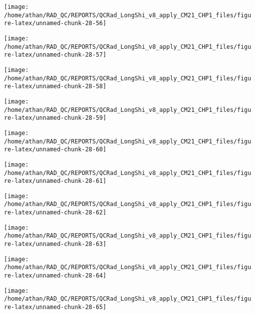 \documentclass[
  10pt,
  a4paper,oneside]{article}
\begin{document}
\begin{center}\texttt{[image: /home/athan/RAD\_QC/REPORTS/QCRad\_LongShi\_v8\_apply\_CM21\_CHP1\_files/figure-latex/unnamed-chunk-28-56]} \end{center}

\begin{center}\texttt{[image: /home/athan/RAD\_QC/REPORTS/QCRad\_LongShi\_v8\_apply\_CM21\_CHP1\_files/figure-latex/unnamed-chunk-28-57]} \end{center}

\begin{center}\texttt{[image: /home/athan/RAD\_QC/REPORTS/QCRad\_LongShi\_v8\_apply\_CM21\_CHP1\_files/figure-latex/unnamed-chunk-28-58]} \end{center}

\begin{center}\texttt{[image: /home/athan/RAD\_QC/REPORTS/QCRad\_LongShi\_v8\_apply\_CM21\_CHP1\_files/figure-latex/unnamed-chunk-28-59]} \end{center}

\begin{center}\texttt{[image: /home/athan/RAD\_QC/REPORTS/QCRad\_LongShi\_v8\_apply\_CM21\_CHP1\_files/figure-latex/unnamed-chunk-28-60]} \end{center}

\begin{center}\texttt{[image: /home/athan/RAD\_QC/REPORTS/QCRad\_LongShi\_v8\_apply\_CM21\_CHP1\_files/figure-latex/unnamed-chunk-28-61]} \end{center}

\begin{center}\texttt{[image: /home/athan/RAD\_QC/REPORTS/QCRad\_LongShi\_v8\_apply\_CM21\_CHP1\_files/figure-latex/unnamed-chunk-28-62]} \end{center}

\begin{center}\texttt{[image: /home/athan/RAD\_QC/REPORTS/QCRad\_LongShi\_v8\_apply\_CM21\_CHP1\_files/figure-latex/unnamed-chunk-28-63]} \end{center}

\begin{center}\texttt{[image: /home/athan/RAD\_QC/REPORTS/QCRad\_LongShi\_v8\_apply\_CM21\_CHP1\_files/figure-latex/unnamed-chunk-28-64]} \end{center}

\begin{center}\texttt{[image: /home/athan/RAD\_QC/REPORTS/QCRad\_LongShi\_v8\_apply\_CM21\_CHP1\_files/figure-latex/unnamed-chunk-28-65]} \end{center}
\end{document}

